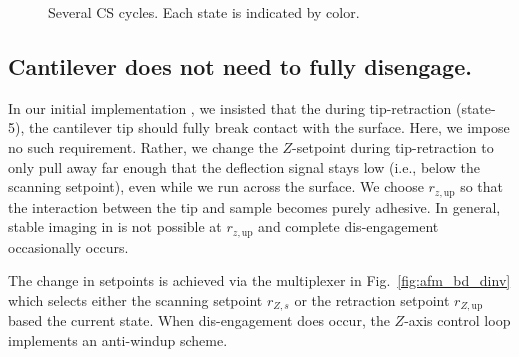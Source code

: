 \documentclass[twocolumn,oneside]{IEEEtran/IEEEtran}
\newcommand{\rzup}{\ensuremath{r_{z,\textrm{up}}}\xspace}
\begin{document}
\begin{figure}[t!]
  \centering
  
  \caption{Several CS cycles. Each state is indicated by color.}
  \label{fig:mupathsignaltrajectory}
\end{figure}

\subsection{Cantilever does not need to fully disengage.}
In our initial implementation \cite{braker_hardware_2018}, we insisted that the during tip-retraction
(state-5), the cantilever tip should fully break contact with the surface. Here,
we impose no such requirement. Rather, we change the $Z$-setpoint during
tip-retraction to only pull away far enough that the deflection signal stays low
(i.e., below the scanning setpoint), even while we run across the surface.
We choose \rzup so that the interaction between the tip and sample becomes purely adhesive.
In general, stable imaging in is not possible at \rzup and complete dis-engagement occasionally occurs.


The change in setpoints is achieved via the multiplexer in Fig.~\ref{fig:afm_bd_dinv}
which selects either the scanning setpoint $r_{Z,s}$ or the retraction setpoint
$r_{Z,\textrm{up}}$ based the current state.
When dis-engagement does occur, the $Z$-axis control loop implements an anti-windup scheme.



\end{document}
